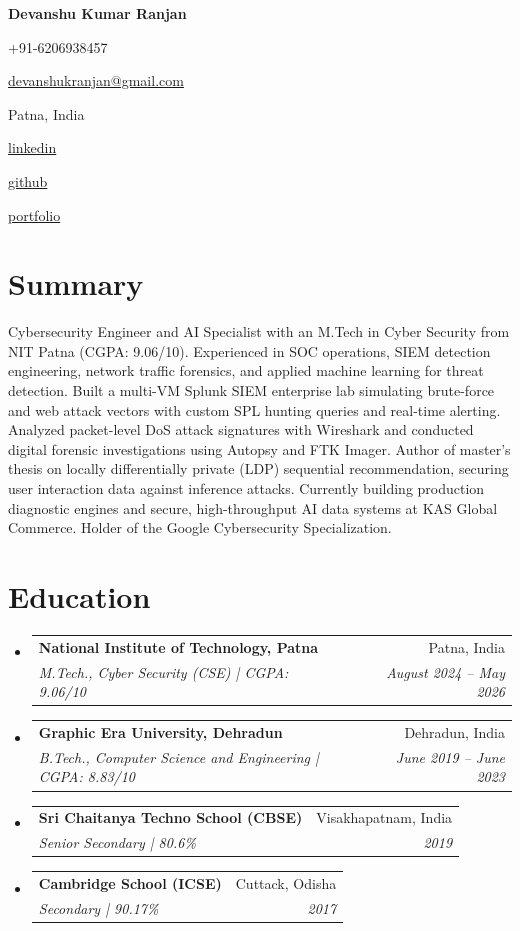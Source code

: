 \documentclass[letterpaper,10pt]{article}
\makeatletter
\newcommand{\contacttag}[2]{%
  \colorbox{tagbg}{\strut\hspace{6pt}#1\hspace{4pt}#2\hspace{6pt}}%
}
\newcommand{\resumeSubheading}[4]{
\vspace{-1pt}\item
  \begin{tabular*}{0.97\textwidth}[t]{l@{\extracolsep{\fill}}r}
    \textbf{#1} & #2 \\
    \textit{#3} & \textit{#4} \\
  \end{tabular*}\vspace{-7pt}
}
\newcommand{\resumeSubHeadingList}{\begin{itemize}[leftmargin=0.15in, label={}]}
\newcommand{\resumeSubHeadingListEnd}{\end{itemize}}
\makeatother
\begin{document}
\begin{center}
  \textbf{\Huge Devanshu Kumar Ranjan} \\
  \vspace{4pt}
  \footnotesize
  \contacttag{}{+91-6206938457}\hspace{3pt}
  \contacttag{}{\href{mailto:devanshukranjan@gmail.com}{devanshukranjan@gmail.com}}\hspace{3pt}
  \contacttag{}{Patna, India}\hspace{3pt}
  \contacttag{}{\href{https://linkedin.com/in/devanshu-kumar-ranjan-06399221b}{linkedin}}\hspace{3pt}
  \contacttag{}{\href{https://github.com/devanshukranjan}{github}}\hspace{3pt}
  \contacttag{}{\href{https://devanshukranjan.github.io/Cybersecurity-Portfolio/}{portfolio}}
\end{center}

\section{Summary}
\small
Cybersecurity Engineer and AI Specialist with an M.Tech in Cyber Security from NIT Patna (CGPA: 9.06/10). Experienced in SOC operations, SIEM detection engineering, network traffic forensics, and applied machine learning for threat detection. Built a multi-VM Splunk SIEM enterprise lab simulating brute-force and web attack vectors with custom SPL hunting queries and real-time alerting. Analyzed packet-level DoS attack signatures with Wireshark and conducted digital forensic investigations using Autopsy and FTK Imager. Author of master's thesis on locally differentially private (LDP) sequential recommendation, securing user interaction data against inference attacks. Currently building production diagnostic engines and secure, high-throughput AI data systems at KAS Global Commerce. Holder of the Google Cybersecurity Specialization.
\normalsize

\section{Education}
\resumeSubHeadingList
  \resumeSubheading
      {National Institute of Technology, Patna}{Patna, India}
      {M.Tech., Cyber Security (CSE) | CGPA: 9.06/10}{August 2024 -- May 2026}
  \resumeSubheading
      {Graphic Era University, Dehradun}{Dehradun, India}
      {B.Tech., Computer Science and Engineering | CGPA: 8.83/10}{June 2019 -- June 2023}
  \resumeSubheading
      {Sri Chaitanya Techno School (CBSE)}{Visakhapatnam, India}{Senior Secondary | 80.6\%}{2019}
  \resumeSubheading
      {Cambridge School (ICSE)}{Cuttack, Odisha}{Secondary | 90.17\%}{2017}
\resumeSubHeadingListEnd
\end{document}
